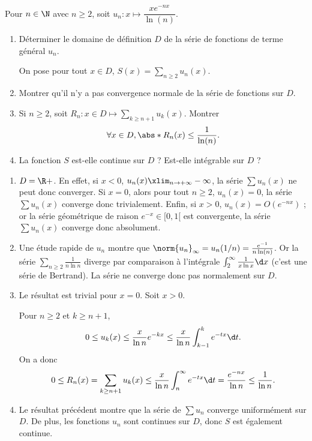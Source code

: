 \begin{enonce}
\begin{exercise}[ID={RMS121/2 E1091 CCP},subtitle={},tags={}, difficulty={0}]
Pour $n\in\N$ avec $n\geq2$, soit $u_n:x\mapsto \dfrac{xe^{-nx}}{\ln(n)}$.
\begin{enumerate}
\item Déterminer le domaine de définition $D$ de la série de fonctions de terme général $u_n$. 
    
On pose pour tout $x\in D$, $S(x)=\sum_{n\geq2} u_n(x)$.
\item Montrer qu'il n'y a pas convergence normale de la série de fonctions sur $D$.
\item Si $n\geq2$, soit $R_n:x\in D\mapsto\sum_{k\geq n+1} u_k(x)$. Montrer
\begin{equation*}
\forall x\in D, \abs*{R_n(x)}\leq\frac{1}{\ln(n)}.
\end{equation*}
\item
La fonction $S$ est-elle continue sur $D$ ? Est-elle intégrable sur $D$ ?
\end{enumerate}
\end{exercise}
\begin{solution}
\begin{enumerate}
\item $D=\R+$. En effet, si $x<0$, $u_n(x)\xlim_{n\to+\infty} -\infty$, la série $\sum u_n(x)$ ne peut donc converger. Si $x=0$, alors pour tout $n\geq 2$, $u_n(x)=0$, la série $\sum u_n(x)$ converge donc trivialement. Enfin, si $x>0$, $u_n(x) = O(e^{-nx})$ ; or la série géométrique de raison $e^{-x}\in[0,1[$ est convergente, la série $\sum u_n(x)$ converge donc absolument.
\item Une étude rapide de $u_n$ montre que $\norm{u_n}_\infty=u_n(1/n)=\frac{e^{-1}}{n\ln (n)}$. Or la série $\sum_{n\geq2} \frac1{n\ln n}$ diverge par comparaison à l'intégrale $\int_2^\infty \frac1{x\ln x}\d x$ (c'est une série de Bertrand).
La série ne converge donc pas normalement sur $D$.
\item Le résultat est trivial pour $x=0$. Soit $x>0$.
    
Pour $n\geq 2$ et $k\ge n+1$,
\begin{equation*}
0\le u_k(x) \le \frac{x}{\ln n} e^{-kx}\le \frac{x}{\ln n}\int_{k-1}^k e^{-tx}\d t.
\end{equation*}
On a donc
\begin{equation*}
0\le R_n(x) = \sum_{k\ge n+1} u_k(x)\le \frac{x}{\ln n}\int_{n}^\infty e^{-tx}\d t = \frac{e^{-nx}}{\ln n}\le \frac1{\ln n}.
\end{equation*}
\item
Le résultat précédent montre que la série de $\sum u_n$ converge uniformément sur $D$.
De plus, les fonctions $u_n$ sont continues sur $D$, donc $S$ est également continue.


\end{enumerate}
\end{solution}
\end{enonce}
